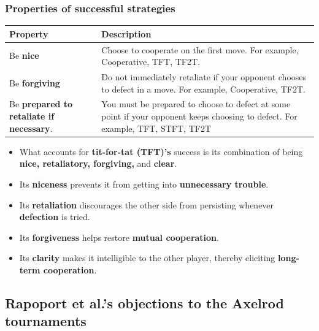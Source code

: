 \documentclass[11pt]{article}
\begin{document}
\subsubsection{Properties of successful strategies}
\label{sec:org337d6b9}
\begin{center}
\begin{tabular}{|m{8em}|m{22em}|}
\hline
Property & Description\\
\hline
Be \textbf{nice} & Choose to cooperate on the first move. For example, Cooperative, TFT, TF2T.\\
\hline
Be \textbf{forgiving} & Do not immediately retaliate if your opponent chooses to defect in a move. For example, Cooperative, TF2T.\\
\hline
Be \textbf{prepared to retaliate if necessary}. & You must be prepared to choose to defect at some point if your opponent keeps choosing to defect. For example, TFT, STFT, TF2T\\
\hline
\end{tabular}
\end{center}
\begin{itemize}
\item What accounts for \textbf{tit-for-tat (TFT)'s} success is its combination of being \textbf{nice, retaliatory, forgiving,} and \textbf{clear}.
\item Its \textbf{niceness} prevents it from getting into \textbf{unnecessary trouble}.
\item Its \textbf{retaliation} discourages the other side from persisting whenever \textbf{defection} is tried.
\item Its \textbf{forgiveness} helps restore \textbf{mutual cooperation}.
\item Its \textbf{clarity} makes it intelligible to the other player, thereby eliciting \textbf{long-term cooperation}.
\end{itemize}

 \newpage
\subsection{Rapoport et al.'s objections to the Axelrod tournaments}
\label{sec:org60ad50e}
\end{document}
